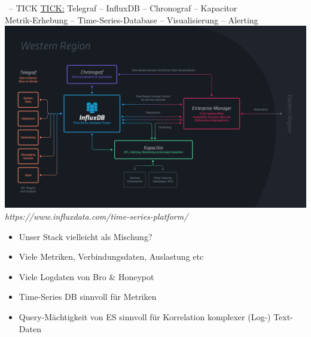 \documentclass{beamer}
\begin{document}
\begin{frame}{\insertsection\ -- TICK}
	\underline{TICK:} Telegraf -- InfluxDB -- Chronograf -- Kapacitor\\
	Metrik-Erhebung -- Time-Series-Database -- Visualisierung -- Alerting
	\includegraphics[width=.9\linewidth,page=1]{img/TICK-Stack.png}\\
	\fontsize{4pt}{7.2}\selectfont
	\textit{https://www.influxdata.com/time-series-platform/}
\end{frame}

\begin{frame}{\insertsection}
	\begin{itemize}
		\setlength\itemsep{1em}
		\item Unser Stack vielleicht als Mischung?
		\item Viele Metriken, Verbindungsdaten, Auslastung etc
		\item Viele Logdaten von Bro \& Honeypot
		\item Time-Series DB sinnvoll für Metriken
		\item Query-Mächtigkeit von ES sinnvoll für Korrelation komplexer (Log-) Text-Daten
	\end{itemize}
\end{frame}





%	
%	
\end{document}
